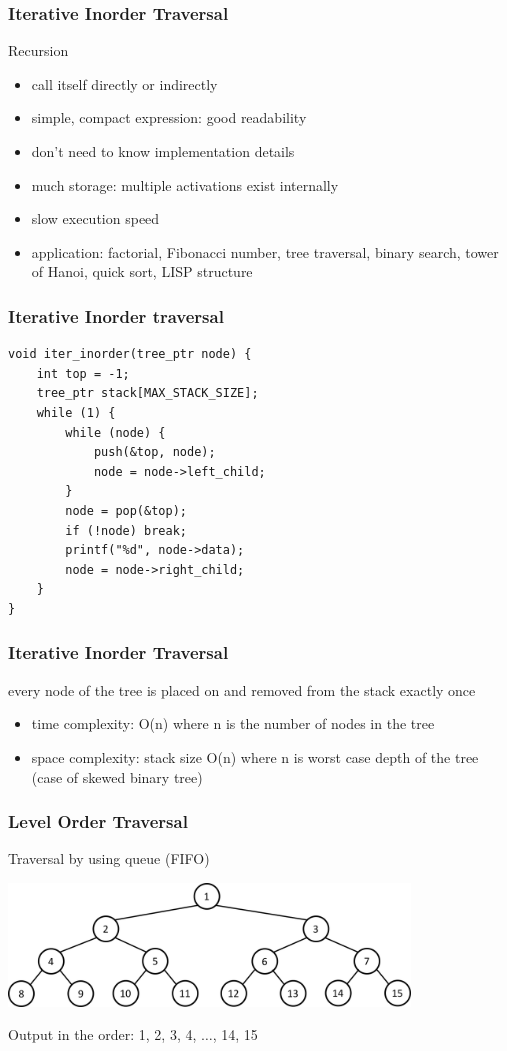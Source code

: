 \documentclass[newPxFont,sthlmFooter,nooffset]{beamer}
\begin{document}
\begin{frame}[t]
  \frametitle{Iterative Inorder Traversal}
Recursion
\begin{itemize}
\item call itself directly or indirectly
\item simple, compact expression: good
readability
\item don’t need to know implementation
details
\item much storage: multiple activations
exist internally
\item  slow execution speed
\item  application: factorial, Fibonacci
number, tree traversal, binary search, tower of Hanoi, quick sort, LISP structure
\end{itemize}
\end{frame}


\begin{frame}[t, fragile]
  \frametitle{Iterative Inorder traversal}
  \begin{lstlisting}
void iter_inorder(tree_ptr node) { 
    int top = -1;
    tree_ptr stack[MAX_STACK_SIZE]; 
    while (1) {
        while (node) {
            push(&top, node);
            node = node->left_child;
        }
        node = pop(&top);
        if (!node) break; 
        printf("%d", node->data); 
        node = node->right_child;
    } 
}    
  \end{lstlisting}
\end{frame}


\begin{frame}[t]
  \frametitle{Iterative Inorder Traversal}
every node of the tree is placed on and removed from the stack exactly once

\begin{itemize}
\item time complexity: O(n) where n is the number of nodes in the tree
\item space complexity: stack size O(n) where n is worst case depth of the
  tree (case of skewed binary tree)
\end{itemize}

\end{frame}


\begin{frame}[t]
  \frametitle{Level Order Traversal}
Traversal by using queue (FIFO)

  \begin{center}
    \includegraphics[width=0.8\textwidth]{figures/fig11_level_order.png}
  \end{center}

Output in the order: 1, 2, 3, 4, $\ldots$, 14, 15
\end{frame}
\end{document}
